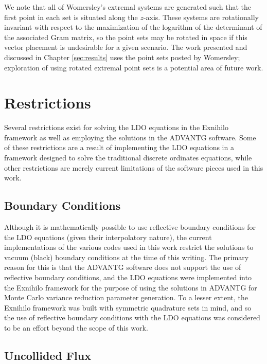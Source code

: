 We note that all of Womersley's extremal systems are generated such that the first
point in each set is situated along the $z$-axis. These systems are rotationally
invariant with respect to the maximization of the logarithm of the determinant of the 
associated Gram matrix, so the point sets may be rotated in space if this vector
placement is undesirable for a given scenario. The work presented and discussed in 
Chapter \ref{sec:results} uses the point sets posted by Womersley; exploration of using
rotated extremal point sets is a potential area of future work.

\section{Restrictions}

Several restrictions exist for solving the LDO equations in the Exnihilo framework as
well as employing the solutions in the ADVANTG software. Some of these restrictions are
a result of implementing the LDO equations in a framework designed to solve the
traditional discrete ordinates equations, while other restrictions are merely 
current limitations of the software pieces used in this work.

\subsection{Boundary Conditions}
\label{sec:bc}

Although it is mathematically possible to use reflective boundary conditions for the
LDO equations (given their interpolatory nature), the current implementations of the
various codes used in this work restrict the solutions to vacuum (black) boundary
conditions at the time of this writing. The primary reason for this is that the
ADVANTG software does not support the use of reflective boundary conditions, and the
LDO equations were implemented into the Exnihilo framework for the purpose of using 
the solutions in ADVANTG for Monte Carlo variance reduction parameter generation. To a
lesser extent, the Exnihilo framework was built with symmetric quadrature sets in mind,
and so the use of reflective boundary conditions with the LDO equations was considered
to be an effort beyond the scope of this work.

\subsection{Uncollided Flux}
\label{sec:uncflux}

